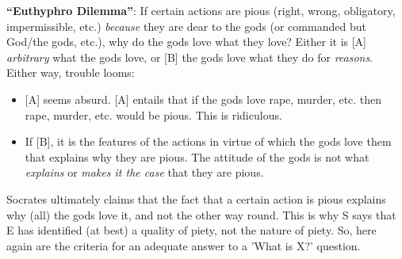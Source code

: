 \documentclass[oneside]{article}
\begin{document}
\noindent \textbf{``Euthyphro Dilemma''}: If certain actions are pious (right, wrong, obligatory, impermissible, etc.) \emph{because} they are dear to the gods (or commanded but God/the gods, etc.), why do the gods love what they love? Either it is [A] \emph{arbitrary} what the gods love, or [B] the gods love what they do for \emph{reasons}. Either way, trouble looms:\begin{itemize}\item{[A] seems absurd. [A] entails that if the gods love rape, murder, etc. then rape, murder, etc. would be pious. This is ridiculous.}\item{If [B], it is the features of the actions in virtue of which the gods love them that explains why they are pious. The attitude of the gods is not what \emph{explains} or \emph{makes it the case} that they are pious.\\} \end{itemize} 


\noindent Socrates ultimately claims that the fact that a certain action is pious explains why (all) the gods love it, and not the other way round. This is why S says that E has identified (at best) a quality of piety, not the nature of piety. So, here again are the criteria for an adequate answer to a 'What is X?' question. 


\end{document}

